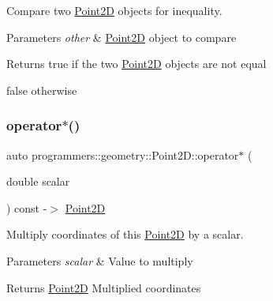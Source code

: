 Compare two \hyperlink{classprogrammers_1_1geometry_1_1Point2D}{Point2D} objects for inequality. 


\begin{DoxyParams}{Parameters}
{\em other} & \hyperlink{classprogrammers_1_1geometry_1_1Point2D}{Point2D} object to compare \\
\hline
\end{DoxyParams}
\begin{DoxyReturn}{Returns}
true if the two \hyperlink{classprogrammers_1_1geometry_1_1Point2D}{Point2D} objects are not equal 

false otherwise 
\end{DoxyReturn}
\mbox{\label{classprogrammers_1_1geometry_1_1Point2D_a5dcc2f602f94d4ebfa71f8d98be3909e}} 
\subsubsection{\texorpdfstring{operator$\ast$()}{operator*()}}
{\footnotesize\ttfamily auto programmers\+::geometry\+::\+Point2\+D\+::operator$\ast$ (\begin{DoxyParamCaption}\item[{double}]{scalar }\end{DoxyParamCaption}) const -\/$>$  \hyperlink{classprogrammers_1_1geometry_1_1Point2D}{Point2D}}



Multiply coordinates of this \hyperlink{classprogrammers_1_1geometry_1_1Point2D}{Point2D} by a scalar. 


\begin{DoxyParams}{Parameters}
{\em scalar} & Value to multiply \\
\hline
\end{DoxyParams}
\begin{DoxyReturn}{Returns}
\hyperlink{classprogrammers_1_1geometry_1_1Point2D}{Point2D} Multiplied coordinates 
\end{DoxyReturn}
\mbox{\label{classprogrammers_1_1geometry_1_1Point2D_a8eec206395faf46be2b4e3048aa5ac31}} 

